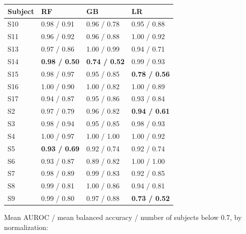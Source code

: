 \documentclass[11pt]{article}
\begin{document}
\begin{longtable}[]{@{}llll@{}}
\toprule\noalign{}
Subject & RF & GB & LR \\
\midrule\noalign{}
\endhead
\bottomrule\noalign{}
\endlastfoot
S10 & 0.98 / 0.91 & 0.96 / 0.78 & 0.95 / 0.88 \\
S11 & 0.96 / 0.92 & 0.96 / 0.88 & 1.00 / 0.92 \\
S13 & 0.97 / 0.86 & 1.00 / 0.99 & 0.94 / 0.71 \\
S14 & \textbf{0.98 / 0.50} & \textbf{0.74 / 0.52} & 0.99 / 0.93 \\
S15 & 0.98 / 0.97 & 0.95 / 0.85 & \textbf{0.78 / 0.56} \\
S16 & 1.00 / 0.90 & 1.00 / 0.82 & 1.00 / 0.89 \\
S17 & 0.94 / 0.87 & 0.95 / 0.86 & 0.93 / 0.84 \\
S2 & 0.97 / 0.79 & 0.96 / 0.82 & \textbf{0.94 / 0.61} \\
S3 & 0.98 / 0.94 & 0.95 / 0.85 & 0.98 / 0.93 \\
S4 & 1.00 / 0.97 & 1.00 / 1.00 & 1.00 / 0.92 \\
S5 & \textbf{0.93 / 0.69} & 0.92 / 0.74 & 0.92 / 0.74 \\
S6 & 0.93 / 0.87 & 0.89 / 0.82 & 1.00 / 1.00 \\
S7 & 0.98 / 0.89 & 0.99 / 0.83 & 0.92 / 0.85 \\
S8 & 0.99 / 0.81 & 1.00 / 0.86 & 0.94 / 0.81 \\
S9 & 0.99 / 0.80 & 0.97 / 0.88 & \textbf{0.73 / 0.52} \\
\end{longtable}

Mean AUROC / mean balanced accuracy / number of subjects below 0.7, by
normalization:
\end{document}
